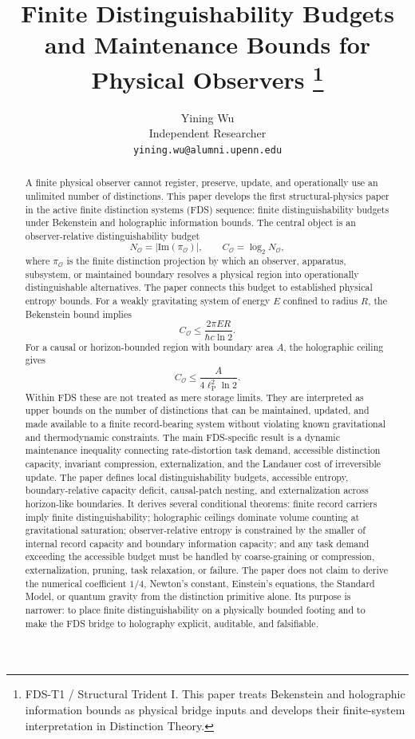 \documentclass[10pt,a4paper,twocolumn,aps,prl]{revtex4-2}
\newcommand{\Obs}{\mathcal{O}}
\newcommand{\NA}{N_{\Obs}}
\newcommand{\CA}{C_{\Obs}}
\begin{document}
\title{Finite Distinguishability Budgets and Maintenance Bounds for Physical Observers%
\footnote{FDS-T1 / Structural Trident I. This paper treats Bekenstein and holographic information bounds as physical bridge inputs and develops their finite-system interpretation in Distinction Theory.}}

\author{Yining Wu\\
Independent Researcher\\
\texttt{yining.wu@alumni.upenn.edu}}

\begin{abstract}
A finite physical observer cannot register, preserve, update, and operationally use an unlimited number of distinctions. This paper develops the first structural-physics paper in the active finite distinction systems (FDS) sequence: finite distinguishability budgets under Bekenstein and holographic information bounds. The central object is an observer-relative distinguishability budget
\[
\NA = \left|\mathrm{Im}(\pi_{\Obs})\right|,\qquad
\CA=\log_2 \NA,
\]
where $\pi_{\Obs}$ is the finite distinction projection by which an observer, apparatus, subsystem, or maintained boundary resolves a physical region into operationally distinguishable alternatives. The paper connects this budget to established physical entropy bounds. For a weakly gravitating system of energy $E$ confined to radius $R$, the Bekenstein bound implies
\[
\CA \leq \frac{2\pi E R}{\hbar c\ln 2}.
\]
For a causal or horizon-bounded region with boundary area $A$, the holographic ceiling gives
\[
\CA \leq \frac{A}{4\ell_{\mathrm P}^2\ln 2}.
\]
Within FDS these are not treated as mere storage limits. They are interpreted as upper bounds on the number of distinctions that can be maintained, updated, and made available to a finite record-bearing system without violating known gravitational and thermodynamic constraints. The main FDS-specific result is a dynamic maintenance inequality connecting rate-distortion task demand, accessible distinction capacity, invariant compression, externalization, and the Landauer cost of irreversible update. The paper defines local distinguishability budgets, accessible entropy, boundary-relative capacity deficit, causal-patch nesting, and externalization across horizon-like boundaries. It derives several conditional theorems: finite record carriers imply finite distinguishability; holographic ceilings dominate volume counting at gravitational saturation; observer-relative entropy is constrained by the smaller of internal record capacity and boundary information capacity; and any task demand exceeding the accessible budget must be handled by coarse-graining or compression, externalization, pruning, task relaxation, or failure. The paper does not claim to derive the numerical coefficient $1/4$, Newton's constant, Einstein's equations, the Standard Model, or quantum gravity from the distinction primitive alone. Its purpose is narrower: to place finite distinguishability on a physically bounded footing and to make the FDS bridge to holography explicit, auditable, and falsifiable.
\end{abstract}
\end{document}
